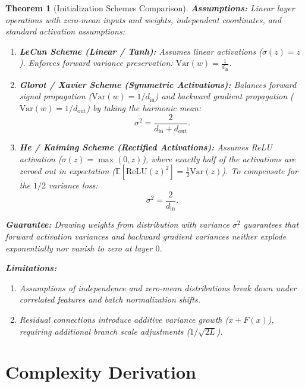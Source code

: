 \documentclass[11pt]{article}
\newtheorem{theorem}{Theorem}
\begin{document}
\begin{theorem}[Initialization Schemes Comparison]
\label{thm:init_schemes}
\textbf{Assumptions:}
Linear layer operations with zero-mean inputs and weights, independent coordinates, and standard activation assumptions:
\begin{enumerate}
    \item \textbf{LeCun Scheme (Linear / Tanh):} Assumes linear activations ($\sigma(z) = z$). Enforces forward variance preservation: $\text{Var}(w) = \frac{1}{d_{\text{in}}}$.
    \item \textbf{Glorot / Xavier Scheme (Symmetric Activations):} Balances forward signal propagation ($\text{Var}(w) = 1/d_{\text{in}}$) and backward gradient propagation ($\text{Var}(w) = 1/d_{\text{out}}$) by taking the harmonic mean:
    \begin{equation}
    \sigma^2 = \frac{2}{d_{\text{in}} + d_{\text{out}}}.
    \end{equation}
    \item \textbf{He / Kaiming Scheme (Rectified Activations):} Assumes ReLU activation ($\sigma(z) = \max(0, z)$), where exactly half of the activations are zeroed out in expectation ($\mathbb{E}[\text{ReLU}(z)^2] = \frac{1}{2} \text{Var}(z)$). To compensate for the $1/2$ variance loss:
    \begin{equation}
    \sigma^2 = \frac{2}{d_{\text{in}}}.
    \end{equation}
\end{enumerate}

\textbf{Guarantee:}
Drawing weights from distribution with variance $\sigma^2$ guarantees that forward activation variances and backward gradient variances neither explode exponentially nor vanish to zero at layer $0$.

\textbf{Limitations:}
\begin{enumerate}
    \item Assumptions of independence and zero-mean distributions break down under correlated features and batch normalization shifts.
    \item Residual connections introduce additive variance growth ($x + F(x)$), requiring additional branch scale adjustments ($1/\sqrt{2L}$).
\end{enumerate}
\end{theorem}

\section{Complexity Derivation}
\label{sec:complexity}
\end{document}
